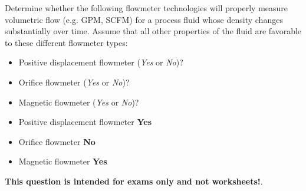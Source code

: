 

Determine whether the following flowmeter technologies will properly measure volumetric flow (e.g. GPM, SCFM) for a process fluid whose density changes substantially over time.  Assume that all other properties of the fluid are favorable to these different flowmeter types:

\begin{itemize}
\item{} Positive displacement flowmeter ({\it Yes} or {\it No})?
\vskip 10pt
\item{} Orifice flowmeter ({\it Yes} or {\it No})?
\vskip 10pt
\item{} Magnetic flowmeter ({\it Yes} or {\it No})?
\end{itemize}







\begin{itemize}
\item{} Positive displacement flowmeter {\bf Yes}
\item{} Orifice flowmeter {\bf No}
\item{} Magnetic flowmeter {\bf Yes}
\end{itemize}







{\bf This question is intended for exams only and not worksheets!}.




